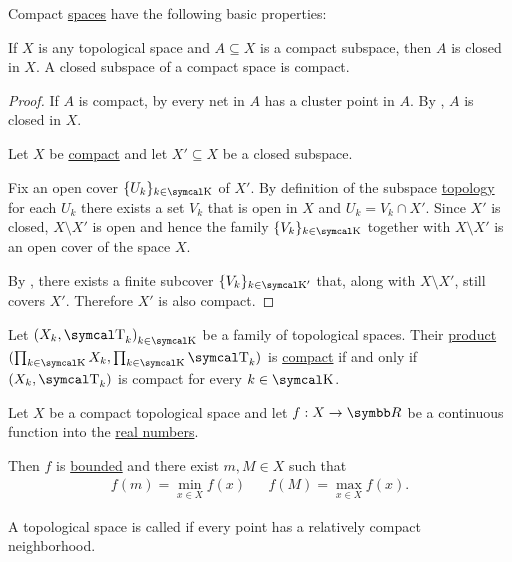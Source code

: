 \begin{proposition}\label{thm:compact_space_properties}
  Compact \hyperref[def:compact_space]{spaces} have the following basic properties:
  \begin{PropEnum}
     If \( X \) is any topological space and \( A \subseteq X \) is a compact subspace, then \( A \) is closed in \( X \).
     A closed subspace of a compact space is compact.
  \end{PropEnum}
\end{proposition}
\begin{proof}
   If \( A \) is compact, by  every net in \( A \) has a cluster point in \( A \). By , \( A \) is closed in \( X \).

   Let \( X \) be \hyperref[def:compact_space]{compact} and let \( X' \subseteq X \) be a closed subspace.

  Fix an open cover \( \{ U_k \}_{k \in \CK} \) of \( X' \). By definition of the subspace \hyperref[def:topological_subspace]{topology} for each \( U_k \) there exists a set \( V_k \) that is open in \( X \) and \( U_k = V_k \cap X' \). Since \( X' \) is closed, \( X \setminus X' \) is open and hence the family \( \{ V_k \}_{k \in \CK} \) together with \( X \setminus X' \) is an open cover of the space \( X \).

  By , there exists a finite subcover \( \{ V_k \}_{k \in \CK'} \) that, along with \( X \setminus X' \), still covers \( X' \). Therefore \( X' \) is also compact.
\end{proof}

\begin{theorem}\label{thm:tychonoffs_product_theorem}
  Let \( { (X_k, \CT_k) }_{k \in \CK} \) be a family of topological spaces. Their \hyperref[def:topological_product]{product} \( (\prod_{k \in \CK} X_k, \prod_{k \in \CK} \CT_k) \) is \hyperref[def:compact_space]{compact} if and only if \( (X_k, \CT_k) \) is compact for every \( k \in \CK \).
\end{theorem}

\begin{theorem}\label{thm:weierstrass_extreme_value_theorem}
  Let \( X \) be a compact topological space and let \( f: X \to \BR \) be a continuous function into the \hyperref[def:real_numbers]{real numbers}.

  Then \( f \) is \hyperref[def:metric_space/bounded_function]{bounded} and there exist \( m, M \in X \) such that
  \begin{align*}
    f(m) = \min_{x \in X} f(x)
     &  &
    f(M) = \max_{x \in X} f(x).
  \end{align*}
\end{theorem}

\begin{definition}\label{def:locally_compact_space}
  A topological space is called  if every point has a relatively compact neighborhood.
\end{definition}
